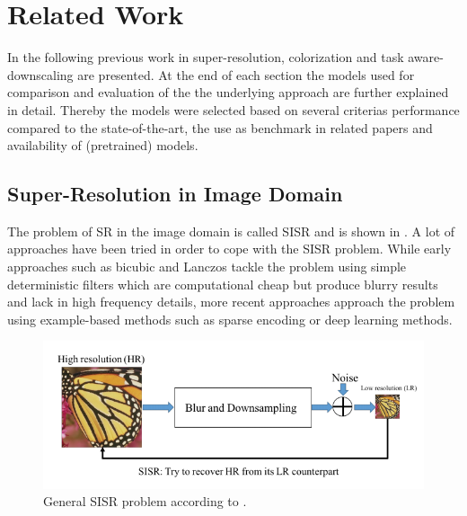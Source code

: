 \newpage
\section{Related Work}
\label{sec:RelatedWork}
In the following previous work in super-resolution, colorization and
task aware-downscaling are presented. At the end of each section the models
used for comparison and evaluation of the the underlying approach are further
explained in detail. Thereby the models were selected based on several criterias
performance compared to the state-of-the-art, the use as benchmark in related
papers and availability of (pretrained) models.

\subsection{Super-Resolution in Image Domain}
The problem of SR in the image domain is called \ac{SISR} and is shown in
. A lot of approaches have been
tried in order to cope with the \ac{SISR} problem. While early approaches such as
bicubic and Lanczos \cite{LFIOATD} tackle the problem using simple deterministic
filters which are computational cheap but produce blurry results and lack in
high frequency details, more recent approaches approach the problem using
example-based methods such as sparse encoding or deep learning methods.

\begin{figure}[!htbp]
	\centering
	\includegraphics[width=14cm]{figures/sisr_problem}
	\caption{General SISR problem  according to \cite{DLFSISRABR}.}
  \label{fig:sisr_problem}
\end{figure}

